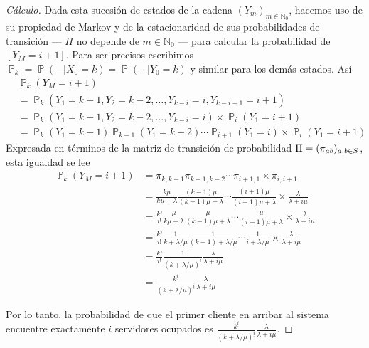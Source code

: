 \documentclass{article}
\DeclareMathOperator{\prob}{\mathbb{P}}
\newcommand{\placeholderParameter}{-}
\newcommand{\naturalnum}{\mathbb{N}}
\theoremstyle{definition}
\begin{document}
\begin{proof}[Cálculo]
Dada esta sucesión de estados de la cadena \((Y_m)_{m \in \naturalnum_0}\), hacemos uso de su propiedad de Markov y de la estacionaridad de sus probabilidades de transición --- \(\Pi\) no depende de \(m \in \naturalnum_0\) --- para calcular la probabilidad de \([Y_M = i + 1]\).
Para ser precisos escribimos \(\prob_k = \prob(\placeholderParameter | X_0 = k) = \prob(\placeholderParameter | Y_0 = k)\) y similar para los demás estados.
Así
\begin{align}
	&\prob_k(Y_M = i + 1) 
	\\
	&=
		\prob_k(Y_1 = k - 1, Y_2 = k - 2, \dots, Y_{k - i} = i, Y_{k - i + 1} = i + 1)
	\\
	&=
		\prob_k(Y_1 = k - 1, Y_2 = k - 2, \dots, Y_{k - i} = i) \times \prob_i(Y_1 = i + 1)
	\\
	&=
		\prob_k(Y_1 = k - 1) \prob_{k - 1}(Y_1 = k - 2) \cdots \prob_{i + 1}(Y_1 = i) \times \prob_i(Y_1 = i + 1)
\end{align}
Expresada en términos de la matriz de transición de probabilidad \(\Pi = (\pi_{a b})_{a,b \in S}\), esta igualdad se lee
\begin{align}
	\prob_k(Y_M = i + 1)
	&=
		\pi_{k, k - 1} \pi_{k - 1, k - 2} \cdots \pi_{i + 1, 1} \times \pi_{i, i + 1}
		\\
	&= 
		\frac{k \mu}{k \mu + \lambda} \frac{(k - 1) \mu}{(k - 1) \mu + \lambda} \cdots \frac{(i + 1) \mu}{(i + 1) \mu + \lambda} \times \frac{\lambda}{\lambda + i \mu}
	\\
	&= 
		\frac{k!}{i!} \frac{ \mu}{k \mu + \lambda} \frac{\mu}{(k - 1) \mu + \lambda} \cdots \frac{\mu}{(i + 1) \mu + \lambda} \times \frac{\lambda}{\lambda + i \mu}
	\\
	&= 
		\frac{k!}{i!} \frac{1}{k + \lambda / \mu} \frac{1}{(k - 1) + \lambda / \mu} \cdots \frac{1}{i + \lambda / \mu} \times \frac{\lambda}{\lambda + i \mu}
	\\
	&= 
		\frac{k!}{i!} \frac{1}{(k + \lambda / \mu)^{\underline{i}}} \frac{\lambda}{\lambda + i \mu}
	\\
	&= 
		\frac{k^{\underline{i}}}{(k + \lambda / \mu)^{\underline{i}}} \frac{\lambda}{\lambda + i \mu}
\end{align}

Por lo tanto, la probabilidad de que el primer cliente en arribar al sistema encuentre exactamente \(i\) servidores ocupados es \(\displaystyle \frac{k^{\underline{i}}}{(k + \lambda / \mu)^{\underline{i}}} \frac{\lambda}{\lambda + i \mu}\).
\end{proof}
\end{document}
